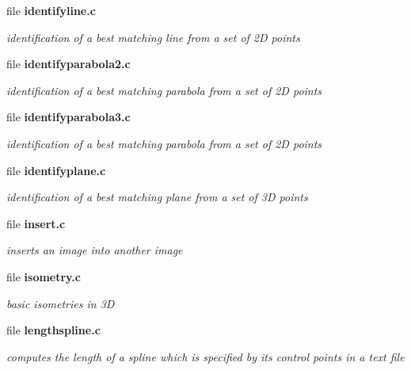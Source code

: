 \begin{CompactItemize}
\item 
file {\bf identifyline.c}
\begin{CompactList}\small\item\em identification of a best matching line from a set of 2D points \item\end{CompactList}

\item 
file {\bf identifyparabola2.c}
\begin{CompactList}\small\item\em identification of a best matching parabola from a set of 2D points \item\end{CompactList}

\item 
file {\bf identifyparabola3.c}
\begin{CompactList}\small\item\em identification of a best matching parabola from a set of 2D points \item\end{CompactList}

\item 
file {\bf identifyplane.c}
\begin{CompactList}\small\item\em identification of a best matching plane from a set of 3D points \item\end{CompactList}

\item 
file {\bf insert.c}
\begin{CompactList}\small\item\em inserts an image into another image \item\end{CompactList}

\item 
file {\bf isometry.c}
\begin{CompactList}\small\item\em basic isometries in 3D \item\end{CompactList}

\item 
file {\bf lengthspline.c}
\begin{CompactList}\small\item\em computes the length of a spline which is specified by its control points in a text file \item\end{CompactList}


\end{CompactItemize}
